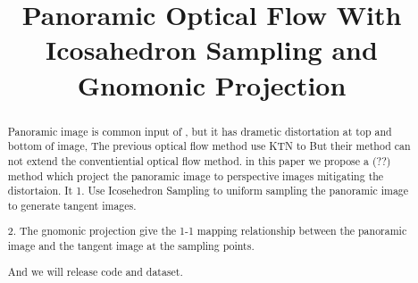 \documentclass{bmvc2k}
\title{Panoramic Optical Flow With Icosahedron Sampling and Gnomonic Projection}
\begin{document}
\maketitle

\begin{abstract}

Panoramic image is common input of , but it has drametic distortation at top and bottom of image, 
The previous optical flow method use KTN to 
But their method can not extend the conventiential optical flow method.
in this paper we propose a (??) method which project the panoramic image to perspective images mitigating the distortaion.
It 
1. Use Icosehedron Sampling to uniform sampling the panoramic image to generate tangent images.

2. The gnomonic projection give the 1-1 mapping relationship between the panoramic image and the tangent image at the sampling points.

And we will release code and dataset.

\end{abstract}













\end{document}
